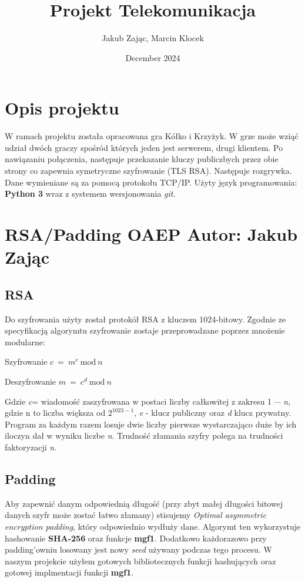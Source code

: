 \documentclass[a4paper,12pt]{article}
\title{Projekt Telekomunikacja}
\author{Jakub Zając, Marcin Klocek}
\date{December 2024}
\begin{document}
\maketitle

\section{Opis projektu}
W ramach projektu została opracowana gra Kółko i Krzyżyk. W grze może wziąć udział dwóch graczy spośród których jeden jest serwerem, drugi klientem. Po nawiązaniu połączenia, następuje przekazanie kluczy publiczbych przez obie strony co zapewnia symetryczne szyfrowanie (TLS RSA). Następuje rozgrywka. Dane wymieniane są za pomocą protokołu TCP/IP. Użyty język programowania: \textbf{Python 3} wraz z systemem wersjonowania \textit{git}.

\section{RSA/Padding OAEP \color{red} Autor: Jakub Zając }
\subsection{RSA}
Do szyfrowania użyty został protokół RSA z kluczem 1024-bitowy. Zgodnie ze specyfikacją algorymtu szyfrowanie zostaje przeprowadzane poprzez mnożenie modularne: \newline

\begin{multicols}{2}
\begin{center}
\Large Szyfrowanie \newline
\Large $ c~=~m^e~\mathrm{mod} ~ n$
\end{center}
\vfill

\begin{center}
\Large Deszyfrowanie \newline
\Large $ m~=~c^d~\mathrm{mod} ~ n$
\end{center}
\vfill
\end{multicols}
Gdzie \textit{c}= wiadomość zaszyfrowana w postaci liczby całkowitej z zakresu  1 $\cdots$ \textit{n}, gdzie n to liczba większa od $2^{1023-1}$, \textit{e} - klucz publiczny oraz \textit{d} klucz prywatny. Program za każdym razem losuje dwie liczby pierwsze wystarczająco duże by ich iloczyn dał w wyniku liczbe \textit{n}. Trudność złamania szyfry polega na trudności faktoryzacji \textit{n}.

\newpage
\subsection{Padding}
Aby zapewnić danym odpowiednią długość (przy zbyt małej długości bitowej danych szyfr może zostać łatwo złamany) stisujemy \textit{Optimal asymmetric encryption padding}, który odpowiednio wydłuży dane. Algorymt ten wykorzystuje hashowanie \textbf{SHA-256}  oraz funkcje \textbf{mgf1}. Dodatkowo każdorazowo przy padding'owniu losowany jest nowy \textit{seed} używany podczas tego procesu. W naszym projekcie użyłem gotowych bibliotecznych funkcji hashujących oraz gotowej implmentacji funkcji \textbf{mgf1}.
\end{document}
